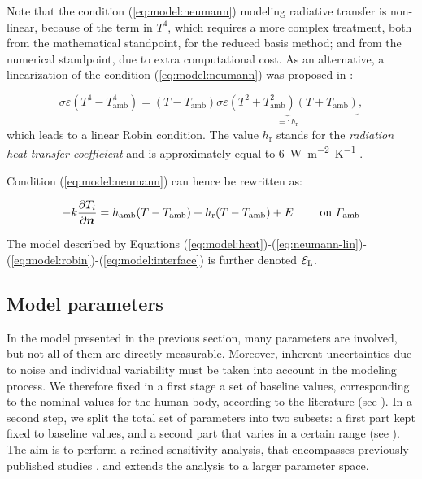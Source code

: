 \begin{rem}
    \label{rem:linearization}
    Note that the condition (\ref{eq:model:neumann}) modeling radiative transfer is non-linear, because of the term in $T^4$,
    which requires a more complex treatment, both from the mathematical standpoint, for the reduced basis method; and from the numerical standpoint, due to extra computational cost.
    As an alternative, a linearization of the condition (\ref{eq:model:neumann}) was proposed in \cite{Scott_1988}:

    \begin{equation*}
        \sigma\varepsilon (T^4-T_\text{amb}^4) = (T-T_\text{amb})\underbrace{\sigma\varepsilon(T^2+T^2_\text{amb})(T+T_\text{amb})}_{=: h_\text{r}},
    \end{equation*}
    which leads to a linear Robin condition.
    The value $h_\text{r}$ stands for the \emph{radiation heat transfer coefficient} and is approximately equal to \qty{6}{\watt.\meter^{-2}.\kelvin^{-1}} \cite{Scott_1988}.%

    Condition (\ref{eq:model:neumann}) can hence be rewritten as:

    \begin{equation}
        -k\dfrac{\partial T_i}{\partial \n} = h_\text{amb}(T-T_\text{amb}) + h_\text{r}(T-T_\text{amb}) + E \qquad\text{ on }\Gamma_\text{amb}
        \label{eq:neumann-lin}
    \end{equation}

    The model described by Equations (\ref{eq:model:heat})-(\ref{eq:neumann-lin})-(\ref{eq:model:robin})-(\ref{eq:model:interface}) is further denoted $\mathcal{E}_\text{L}$.
\end{rem}



\subsection{Model parameters}
\label{sec:parameters}

In the model presented in the previous section, many parameters are involved, but not all of them are directly measurable.
Moreover, inherent uncertainties due to noise and individual variability must be taken into account in the modeling process.
We therefore fixed in a first stage a set of baseline values, corresponding to the nominal values for the human body, according to the literature \cite{Scott_1988, NG2006268} (see ).
In a second step, we split the total set of parameters into two subsets:
a first part kept fixed to baseline values, and a second part that varies in a certain range (see ).
The aim is to perform a refined sensitivity analysis, that encompasses previously published studies \cite{Scott_1988, NG2006268, NG2007829}, and extends the analysis to a larger parameter space.

